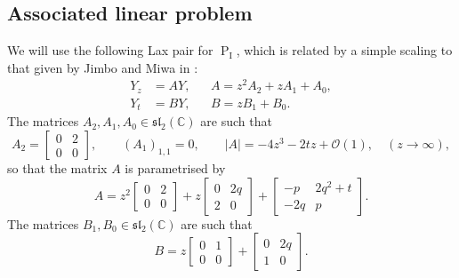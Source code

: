 \documentclass[a4paper,reqno]{amsart}
\numberwithin{equation}{section}
\newcommand{\C}{\mathbb{C}}
\newcommand{\pain}[1]{\operatorname{P}_{\mathrm{#1}}}
\numberwithin{equation}{section}
\begin{document}
\subsection{Associated linear problem}



We will use the following Lax pair for $\pain{I}$, which is related by a simple scaling to that given by Jimbo and Miwa in \cite{jimbomiwaII1981}:
    \begin{subequations} \label{eq:laxpairPI}
            \begin{align}
                Y_z &= A Y, &   &A = z^2 A_2+z A_1+ A_{0}, \label{eq:laxpairPI1} \\
                Y_t &= B Y, &   &B = z B_1 + B_0. \label{eq:laxpairPI2}
            \end{align}
    \end{subequations}
The matrices $A_2,A_1,A_0\in\mathfrak{sl}_2(\C)$ are 
such that 
\begin{equation*}
    A_2 = \begin{bmatrix}
        0 & 2 \\
        0 & 0
    \end{bmatrix}, 
    \qquad (A_1)_{1,1}=0,
    \qquad |A| = - 4 z^3 - 2 t z + \mathcal{O}(1),\quad (z\to \infty),
\end{equation*}
so that the matrix $A$ is parametrised by 
\begin{equation}\label{eq:matrixAPI}
    A = z^2\begin{bmatrix}
        0 & 2 \\
        0 & 0
    \end{bmatrix}
    + z \begin{bmatrix}
        0 & 2 q \\
        2 & 0
    \end{bmatrix}
    + \begin{bmatrix}
         -p & 2q^2 + t\\
        -2 q &  p
    \end{bmatrix}.
\end{equation}
The matrices $B_1,B_0\in \mathfrak{sl}_{2}(\C)$ are such that 
\begin{equation} \label{eq:matrixBPI}
    B = z\begin{bmatrix}
        0 & 1\\
        0 & 0
    \end{bmatrix}
    + \begin{bmatrix}
        0 & 2 q \\
        1 & 0
    \end{bmatrix}.
\end{equation}
\end{document}
